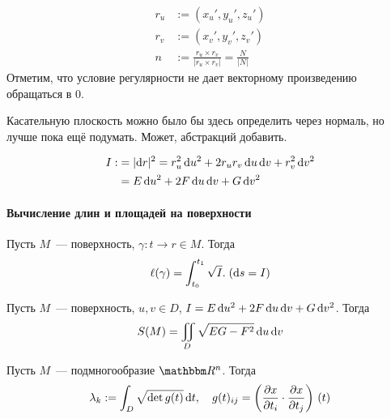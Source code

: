 \documentclass[draft,timbord]{longnotes}
\begin{document}
\begin{defn}\label{defn:dg::tangplane::tanv}
  \[
    \begin{split}
      r_u &:= (x_u', y_u', z_u') \\
      r_v &:= (x_v', y_v', z_v') \\
      n &:= \frac{r_u \times r_v}{|r_u \times r_v|} = \frac{N}{|N|} 
    \end{split}
  \]
  Отметим, что условие регулярности не дает векторному произведению обращаться в 0.
  
  Касательную плоскость можно было бы здесь определить через нормаль, но лучше пока ещё подумать.
  Может, абстракций добавить.
\end{defn}



\begin{defn}\label{defn:dg::tangplane::I}
  \[
    \begin{split}
      I :&= |\mathrm{d} r|^2  = r_u^2\, \mathrm{d} u^2 + 2r_u r_v\, \mathrm{d} u \,\mathrm{d} v + r_v^2\, \mathrm{d} v^2 \\
        &= E \, \mathrm{d} u^2 + 2F\, \mathrm{d} u \,\mathrm{d} v + G\, \mathrm{d} v^2 
    \end{split}
  \]
\end{defn}

\paragraph{Вычисление длин и площадей на поверхности}
\label{par:dg::area}

\begin{thrm}\label{thrm:dg::area::len}
  Пусть $M$~--- поверхность, $\gamma \colon t \to r \in M$.
  Тогда \[
    \ell(\gamma)= \displaystyle\int_{t_0}^{t_1} \sqrt I.\; (\mathrm{d} s = I)
  \]
\end{thrm}

\begin{thrm}\label{thrm:dg::area::area}
  Пусть $M$~--- поверхность, $u,v\in D$, $I = E \, \mathrm{d} u^2 + 2F\, \mathrm{d} u \,\mathrm{d} v + G\, \mathrm{d} v^2$.
  Тогда
  \[
    S(M) = \iint_D \sqrt{EG - F^2}\, \mathrm{d} u\,\mathrm{d} v
  \]
\end{thrm}


\quest{}

\begin{defn}\label{thrm:dg::area::manifold}
  Пусть $M$~--- подмногообразие $\R^n$.  Тогда 
  \[
      \lambda_k := \int _D \sqrt {\det g(t)} \, \mathrm{d} t, \quad
      g(t)_{ij} = \left(\frac{\partial x}{\partial t_i} \cdot \frac{\partial x}{\partial t_j}\right)\, (t)
  \]
\end{defn}
\end{document}

